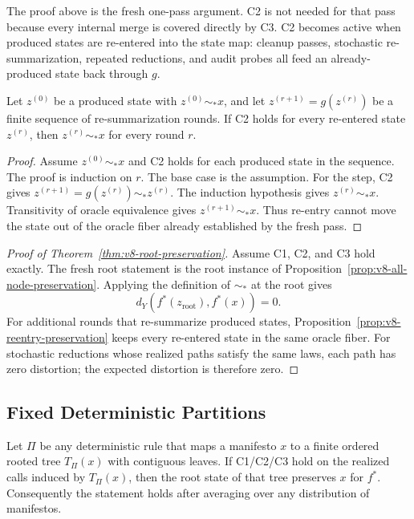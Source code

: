 The proof above is the fresh one-pass argument. C2 is not needed for
that pass because every internal merge is covered directly by C3. C2
becomes active when produced states are re-entered into the state map:
cleanup passes, stochastic re-summarization, repeated reductions, and
audit probes all feed an already-produced state back through \(g\).

\begin{proposition}
\label{prop:v8-reentry-preservation}
Let \(z^{(0)}\) be a produced state with \(z^{(0)}\sim_\ast x\), and
let \(z^{(r+1)}=g(z^{(r)})\) be a finite sequence of re-summarization
rounds. If C2 holds for every re-entered state \(z^{(r)}\), then
\(z^{(r)}\sim_\ast x\) for every round \(r\).
\end{proposition}

\begin{proof}
Assume \(z^{(0)}\sim_\ast x\) and C2 holds for each produced state in
the sequence. The proof is induction on \(r\). The base case is the
assumption. For the step, C2 gives
\(z^{(r+1)}=g(z^{(r)})\sim_\ast z^{(r)}\). The induction hypothesis
gives \(z^{(r)}\sim_\ast x\). Transitivity of oracle equivalence gives
\(z^{(r+1)}\sim_\ast x\). Thus re-entry cannot move the state out of
the oracle fiber already established by the fresh pass.
\end{proof}

\begin{proof}[Proof of Theorem~\ref{thm:v8-root-preservation}]
Assume C1, C2, and C3 hold exactly. The fresh root statement is the
root instance of Proposition~\ref{prop:v8-all-node-preservation}.
Applying the definition of \(\sim_\ast\) at the root gives
\[
  d_Y\!\left(f^\ast(z_{\mathrm{root}}),f^\ast(x)\right)=0 .
\]
For additional rounds that re-summarize produced states,
Proposition~\ref{prop:v8-reentry-preservation} keeps every re-entered
state in the same oracle fiber. For stochastic reductions whose
realized paths satisfy the same laws, each path has zero distortion;
the expected distortion is therefore zero.
\end{proof}

\subsection{Fixed Deterministic Partitions}
\label{app:v8-fixed-partition}

\begin{proposition}
\label{prop:v8-fixed-partition}
Let \(\Pi\) be any deterministic rule that maps a manifesto \(x\) to a finite
ordered rooted tree \(T_\Pi(x)\) with contiguous leaves. If C1/C2/C3 hold on
the realized calls induced by \(T_\Pi(x)\), then the root state of that tree
preserves \(x\) for \(f^\ast\). Consequently the statement holds after
averaging over any distribution of manifestos.
\end{proposition}

